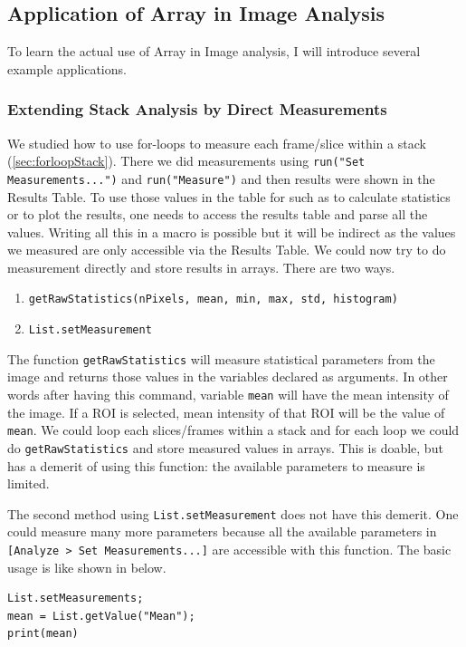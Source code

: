 \documentclass[11pt,a4paper,oneside]{report}
\newcommand{\ilcom}[1]{\texttt{\small#1}}
\begin{document}
\subsection{Application of Array in Image Analysis}

To learn the actual use of Array in Image analysis, I will introduce several example applications.

\subsubsection{Extending Stack Analysis by Direct Measurements}

We studied how to use for-loops to measure each frame/slice within a stack (\ref{sec:forloopStack}). There we did measurements using \ilcom{run("Set Measurements...")} and \ilcom{run("Measure")} and then results were shown in the Results Table. To use those values in the table for such as to calculate statistics or to plot the results, one needs to access the results table and parse all the values. Writing all this in a macro is possible but it will be indirect as the values we measured are only accessible via the Results Table. We could now try to do measurement directly and store results in arrays. There are two ways. 

\begin{enumerate}
\item \ilcom{getRawStatistics(nPixels, mean, min, max, std, histogram)}
\item \ilcom{List.setMeasurement}
\end{enumerate}
The function \ilcom{getRawStatistics} will measure statistical parameters from the image and returns those values in the variables declared as arguments. In other words after having this command, variable \ilcom{mean} will have the mean intensity of the image. If a ROI is selected, mean intensity of that ROI will be the value of \ilcom{mean}. We could loop each slices/frames within a stack and for each loop we could do \ilcom{getRawStatistics} and store measured values in arrays. This is doable, but has a demerit of using this function: the available parameters to measure is limited. 

The second method using \ilcom{List.setMeasurement} does not have this demerit. One could measure many more parameters because all the available parameters in \ilcom{[Analyze > Set Measurements...]} are accessible with this function. The basic usage is like shown in below.

\begin{lstlisting}
List.setMeasurements;
mean = List.getValue("Mean");
print(mean)
\end{lstlisting}
\end{document}
